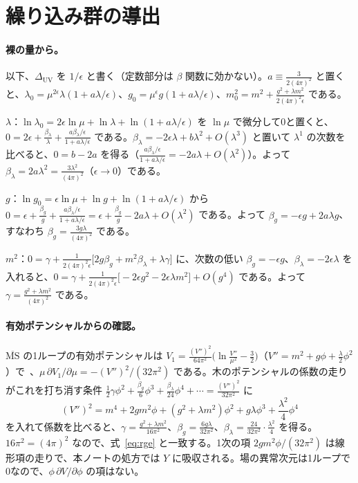 \documentclass[a4paper,10pt]{ltjsarticle}
\begin{document}
\section{繰り込み群の導出}\label{app:rg}

\paragraph{裸の量から。}以下、$\Delta_{\mathrm{UV}}$ を $1/\epsilon$ と書く（定数部分は $\beta$ 関数に効かない）。$a\equiv\frac{3}{2(4\pi)^2}$ と置くと、$\lambda_0=\mu^{2\epsilon}\lambda(1+a\lambda/\epsilon)$、$g_0=\mu^\epsilon g(1+a\lambda/\epsilon)$、$m_0^2=m^2+\frac{g^2+\lambda m^2}{2(4\pi)^2\epsilon}$ である。

$\lambda$：$\ln\lambda_0=2\epsilon\ln\mu+\ln\lambda+\ln(1+a\lambda/\epsilon)$ を $\ln\mu$ で微分して0と置くと、$0=2\epsilon+\frac{\beta_\lambda}{\lambda}+\frac{a\beta_\lambda/\epsilon}{1+a\lambda/\epsilon}$ である。$\beta_\lambda=-2\epsilon\lambda+b\lambda^2+O(\lambda^3)$ と置いて $\lambda^1$ の次数を比べると、$0=b-2a$ を得る（$\frac{a\beta_\lambda/\epsilon}{1+a\lambda/\epsilon}=-2a\lambda+O(\lambda^2)$）。よって $\beta_\lambda=2a\lambda^2=\frac{3\lambda^2}{(4\pi)^2}$（$\epsilon\to0$）である。

$g$：$\ln g_0=\epsilon\ln\mu+\ln g+\ln(1+a\lambda/\epsilon)$ から $0=\epsilon+\frac{\beta_g}{g}+\frac{a\beta_\lambda/\epsilon}{1+a\lambda/\epsilon}=\epsilon+\frac{\beta_g}{g}-2a\lambda+O(\lambda^2)$ である。よって $\beta_g=-\epsilon g+2a\lambda g$、すなわち $\beta_g=\frac{3g\lambda}{(4\pi)^2}$ である。

$m^2$：$0=\gamma+\frac{1}{2(4\pi)^2\epsilon}\bigl[2g\beta_g+m^2\beta_\lambda+\lambda\gamma\bigr]$ に、次数の低い $\beta_g=-\epsilon g$、$\beta_\lambda=-2\epsilon\lambda$ を入れると、$0=\gamma+\frac{1}{2(4\pi)^2\epsilon}\bigl[-2\epsilon g^2-2\epsilon\lambda m^2\bigr]+O(g^4)$ である。よって $\gamma=\frac{g^2+\lambda m^2}{(4\pi)^2}$ である。

\paragraph{有効ポテンシャルからの確認。}$\overline{\mathrm{MS}}$ の1ループの有効ポテンシャルは $V_1=\frac{(V'')^2}{64\pi^2}\bigl(\ln\frac{V''}{\mu^2}-\frac32\bigr)$（$V''=m^2+g\phi+\frac\lambda2\phi^2$）で~\cite{cw}、$\mu\,\partial V_1/\partial\mu=-(V'')^2/(32\pi^2)$ である。木のポテンシャルの係数の走りがこれを打ち消す条件 $\frac12\gamma\phi^2+\frac{\beta_g}{6}\phi^3+\frac{\beta_\lambda}{24}\phi^4+\cdots=\frac{(V'')^2}{32\pi^2}$ に
\begin{equation*}
(V'')^2=m^4+2gm^2\phi+(g^2+\lambda m^2)\phi^2+g\lambda\phi^3+\frac{\lambda^2}{4}\phi^4
\end{equation*}
を入れて係数を比べると、$\gamma=\frac{g^2+\lambda m^2}{16\pi^2}$、$\beta_g=\frac{6g\lambda}{32\pi^2}$、$\beta_\lambda=\frac{24}{32\pi^2}\cdot\frac{\lambda^2}{4}$ を得る。$16\pi^2=(4\pi)^2$ なので、式~\eqref{eq:rge} と一致する。1次の項 $2gm^2\phi/(32\pi^2)$ は線形項の走りで、本ノートの処方では $Y$ に吸収される。場の異常次元は1ループで0なので、$\phi\,\partial V/\partial\phi$ の項はない。
\end{document}
